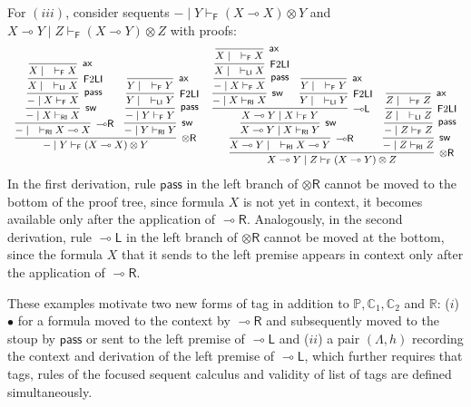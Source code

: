 \documentclass[submission,copyright,creativecommons]{eptcs}
\theoremstyle{definition}
\newcommand{\tr}{\otimes \mathsf{R}}
\newcommand{\lright}{{\multimap}\mathsf{R}}
\newcommand{\lleft}{{\multimap}\mathsf{L}}
\newcommand{\pass}{\mathsf{pass}}
\newcommand{\ax}{\mathsf{ax}}
\newcommand{\ot}{\otimes}
\newcommand{\lolli}{\multimap}
\newcommand{\RI}{\mathsf{RI}}
\newcommand{\LI}{\mathsf{LI}}
\newcommand{\F}{\mathsf{F}}
\newcommand{\tP}{\mathbb{P}}
\newcommand{\tCone}{\mathbb{C}_1}
\newcommand{\tCtwo}{\mathbb{C}_2}
\newcommand{\tE}{\mathbb{R}}
\newcommand{\proofbox}[1]{\begin{tabular}{l} #1 \end{tabular}}
\begin{document}
For $(iii)$, consider sequents ${-} \mid Y \vdash_{\F} (X \lolli X) \ot Y$ and $X \lolli Y \mid Z \vdash_{\F} (X \lolli Y) \ot Z$ with proofs:
\begin{equation}\label{eq:counterexample1}
  \small
    \proofbox{
       \infer[\tr]{{-} \mid Y \vdash_{\F} (X \lolli X) \ot Y}{
      \infer[\lright]{{-} \mid \quad \vdash_{\RI} X \lolli X}{
        \infer[\mathsf{sw}]{{-} \mid X \vdash_{\RI} X}{
          \infer[\pass]{{-} \mid X \vdash_{\F} X}{
            \infer[\F 2 \LI]{X \mid \quad \vdash_{\LI} X}{
              \infer[\ax]{X \mid \quad \vdash_{\F} X}{}
            }
          }
        }
      }
      &
      \infer[\mathsf{sw}]{{-} \mid Y \vdash_{\RI} Y}{
        \infer[\pass]{{-} \mid Y \vdash_{\F} Y}{
          \infer[\F 2 \LI]{Y \mid \quad \vdash_{\LI} Y}{
            \infer[\ax]{Y \mid \quad \vdash_{\F} Y}{}
          }
        }
      }
       }
       }
  \proofbox{
     \infer[\tr]{X \lolli Y \mid Z \vdash_{\F} (X \lolli Y) \ot Z}{
      \infer[\lright]{X \lolli Y \mid \quad \vdash_{\RI} X \lolli Y}{
        \infer[\mathsf{sw}]{X \lolli Y \mid X \vdash_{\RI} Y}{
          \infer[\lleft]{X \lolli Y \mid X \vdash_{\F} Y}{
            \infer[\mathsf{sw}]{{-} \mid X \vdash_{\RI} X}{
              \infer[\pass]{{-} \mid X \vdash_{\F} X}{
                \infer[\F 2 \LI]{X \mid \quad \vdash_{\LI} X}{
                  \infer[\ax]{X \mid \quad \vdash_{\F} X}{}
                }
              }
            }
            &
            \infer[\F 2 \LI]{Y \mid \quad \vdash_{\LI} Y}{
              \infer[\ax]{Y \mid \quad \vdash_{\F} Y}{}
            }
          }
        }
      }
      &
      \infer[\mathsf{sw}]{{-} \mid Z \vdash_{\RI} Z}{
        \infer[\pass]{{-} \mid Z \vdash_{\F} Z}{
          \infer[\F 2 \LI]{Z \mid \quad \vdash_{\LI} Z}{
            \infer[\ax]{Z \mid \quad \vdash_{\F} Z}{}
          }
        }
      }
     }
     }
\end{equation}
In the first derivation, rule $\pass$ in the left branch of $\tr$ cannot be moved to the bottom of the proof tree, since formula $X$ is not yet in context, it becomes available only after the application of $\lright$. Analogously, in the second derivation, rule $\lleft$ in the left branch of $\tr$ cannot be moved at the bottom, since the formula $X$ that it sends to the left premise appears in context only after the application of $\lright$.

These examples motivate two new forms of tag in addition to $\tP,\tCone,\tCtwo$ and $\tE$: ($i$) $\bullet$ for a formula moved to the context by $\lright$ and subsequently moved to the stoup by $\pass$ or sent to the left premise of $\lleft$ and ($ii$) a pair $(\Lambda,h)$ recording the context and derivation of the left premise of $\lleft$, which further requires that tags, rules of the focused sequent calculus and validity of list of tags are defined simultaneously. 
\end{document}
